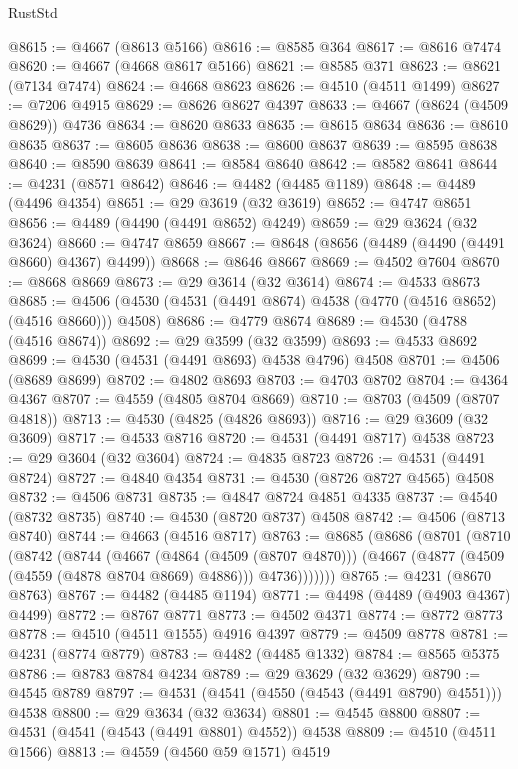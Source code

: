 \begin{lexlean}{RustStd}
\begin{coremodule}
{\begin{coremodule}
{{{{{{{{{{{{{{{{{{{{{{{{{{{{{{{{{{{{{{{{{{{{{{{{{{{{{{{@8615 := @4667 (@8613 @5166)
@8616 := @8585 @364
@8617 := @8616 @7474
@8620 := @4667 (@4668 @8617 @5166)
@8621 := @8585 @371
@8623 := @8621 (@7134 @7474)
@8624 := @4668 @8623
@8626 := @4510 (@4511 @1499)
@8627 := @7206 @4915
@8629 := @8626 @8627 @4397
@8633 := @4667 (@8624 (@4509 @8629)) @4736
@8634 := @8620 @8633
@8635 := @8615 @8634
@8636 := @8610 @8635
@8637 := @8605 @8636
@8638 := @8600 @8637
@8639 := @8595 @8638
@8640 := @8590 @8639
@8641 := @8584 @8640
@8642 := @8582 @8641
@8644 := @4231 (@8571 @8642)
@8646 := @4482 (@4485 @1189)
@8648 := @4489 (@4496 @4354)
@8651 := @29 @3619 (@32 @3619)
@8652 := @4747 @8651
@8656 := @4489 (@4490 (@4491 @8652) @4249)
@8659 := @29 @3624 (@32 @3624)
@8660 := @4747 @8659
@8667 := @8648 (@8656 (@4489 (@4490 (@4491 @8660) @4367) @4499))
@8668 := @8646 @8667
@8669 := @4502 @7604
@8670 := @8668 @8669
@8673 := @29 @3614 (@32 @3614)
@8674 := @4533 @8673
@8685 := @4506 (@4530 (@4531 (@4491 @8674) @4538 (@4770 (@4516 @8652) (@4516 @8660))) @4508)
@8686 := @4779 @8674
@8689 := @4530 (@4788 (@4516 @8674))
@8692 := @29 @3599 (@32 @3599)
@8693 := @4533 @8692
@8699 := @4530 (@4531 (@4491 @8693) @4538 @4796) @4508
@8701 := @4506 (@8689 @8699)
@8702 := @4802 @8693
@8703 := @4703 @8702
@8704 := @4364 @4367
@8707 := @4559 (@4805 @8704 @8669)
@8710 := @8703 (@4509 (@8707 @4818))
@8713 := @4530 (@4825 (@4826 @8693))
@8716 := @29 @3609 (@32 @3609)
@8717 := @4533 @8716
@8720 := @4531 (@4491 @8717) @4538
@8723 := @29 @3604 (@32 @3604)
@8724 := @4835 @8723
@8726 := @4531 (@4491 @8724)
@8727 := @4840 @4354
@8731 := @4530 (@8726 @8727 @4565) @4508
@8732 := @4506 @8731
@8735 := @4847 @8724 @4851 @4335
@8737 := @4540 (@8732 @8735)
@8740 := @4530 (@8720 @8737) @4508
@8742 := @4506 (@8713 @8740)
@8744 := @4663 (@4516 @8717)
@8763 := @8685
    (@8686
      (@8701
        (@8710
          (@8742
            (@8744
              (@4667
                (@4864 (@4509 (@8707 @4870)))
                (@4667 (@4877 (@4509 (@4559 (@4878 @8704 @8669) @4886))) @4736)))))))
@8765 := @4231 (@8670 @8763)
@8767 := @4482 (@4485 @1194)
@8771 := @4498 (@4489 (@4903 @4367) @4499)
@8772 := @8767 @8771
@8773 := @4502 @4371
@8774 := @8772 @8773
@8778 := @4510 (@4511 @1555) @4916 @4397
@8779 := @4509 @8778
@8781 := @4231 (@8774 @8779)
@8783 := @4482 (@4485 @1332)
@8784 := @8565 @5375
@8786 := @8783 @8784 @4234
@8789 := @29 @3629 (@32 @3629)
@8790 := @4545 @8789
@8797 := @4531 (@4541 (@4550 (@4543 (@4491 @8790) @4551))) @4538
@8800 := @29 @3634 (@32 @3634)
@8801 := @4545 @8800
@8807 := @4531 (@4541 (@4543 (@4491 @8801) @4552)) @4538
@8809 := @4510 (@4511 @1566)
@8813 := @4559 (@4560 @59 @1571) @4519
}}}}}}}}}}}}}}}}}}}}}}}}}}}}}}}}}}}}}}}}}}}}}}}}}}}}}}}
\end{coremodule}}
\end{coremodule}
\end{lexlean}
